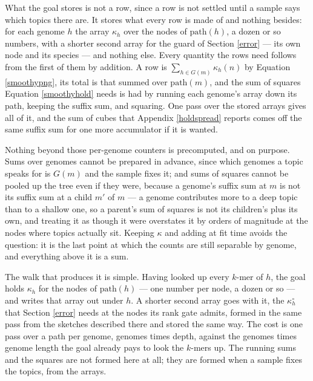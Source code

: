 \documentclass[pdflatex,sn-vancouver-num]{sn-jnl}
\begin{document}
    What the goal stores is not a row, since a row is not settled until a sample says which topics
    there are. It stores what every row is made of and nothing besides: for each genome $h$ the array
    $\kappa_h$ over the nodes of $\mathrm{path}(h)$, a dozen or so numbers, with a shorter second
    array for the guard of Section \ref{error} --- its own node and its species --- and nothing
    else. Every quantity the rows
    need follows from the first of them by addition. A row is $\sum_{h \in G(m)} \kappa_h(n)$ by
    Equation \eqref{smoothypng}, its total is that summed over $\mathrm{path}(m)$, and the sum of
    squares Equation \eqref{smoothyhold} needs is had by running each genome's array down its path,
    keeping the suffix sum, and squaring. One pass over the stored arrays gives all of it, and the
    sum of cubes that Appendix \ref{holdspread} reports comes off the same suffix sum for one more
    accumulator if it is wanted.

    Nothing beyond those per-genome counters is precomputed, and on purpose. Sums over genomes cannot be prepared in
    advance, since which genomes a topic speaks for is $G(m)$ and the sample fixes it; and sums of
    squares cannot be pooled up the tree even if they were, because a genome's suffix sum at $m$ is
    not its suffix sum at a child $m'$ of $m$ --- a genome contributes more to a deep topic than to a shallow one, so a
    parent's sum of squares is not its children's plus its own, and treating it as though it were
    overstates it by orders of magnitude at the nodes where topics actually sit. Keeping $\kappa$ and
    adding at fit time avoids the question: it is the last point at which the counts are still
    separable by genome, and everything above it is a sum.

    The walk that produces it is simple. Having looked up every $k$-mer of $h$, the goal holds
    $\kappa_h$ for the nodes of $\mathrm{path}(h)$ --- one number per node, a dozen or so --- and
    writes that array out under $h$. A shorter second array goes with it, the $\kappa^{\circ}_h$
    that Section \ref{error} needs at the nodes its rank gate admits, formed in the same pass from
    the sketches described there and stored the same way. The cost is one pass over a path per genome, genomes times
    depth, against the genomes times genome length the goal already pays to look the $k$-mers up. The
    running sums and the squares are not formed here at all; they are formed when a sample fixes the
    topics, from the arrays.
\end{document}
